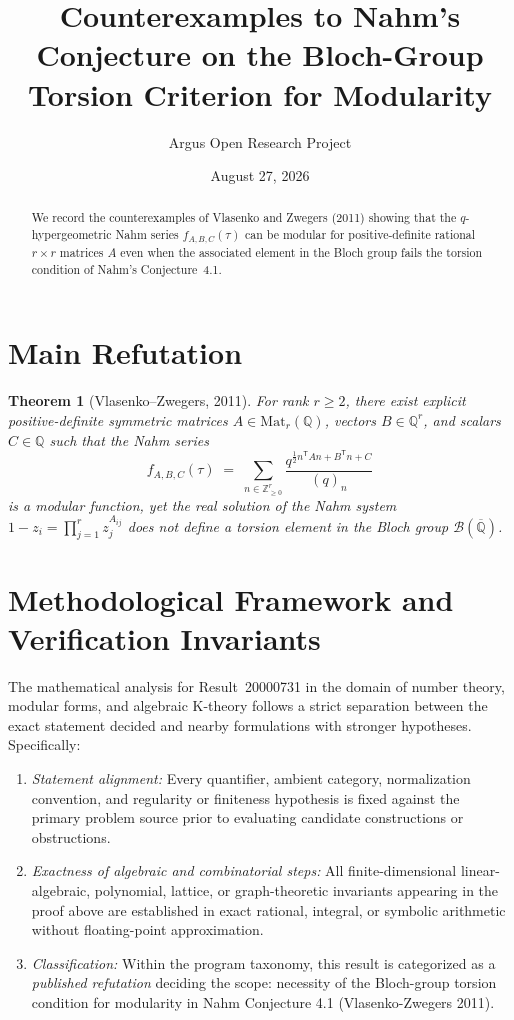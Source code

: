 \documentclass[10pt,reqno]{amsart}
\title[Counterexamples to Nahm's Conjecture 4.1 on $q$-Hypergeometric Modularity]
{Counterexamples to Nahm's Conjecture on the Bloch-Group Torsion Criterion for Modularity}
\author{Argus Open Research Project}
\date{August 27, 2026}
\newtheorem{theorem}{Theorem}[section]
\theoremstyle{definition}
\begin{document}
\begin{abstract}
We record the counterexamples of Vlasenko and Zwegers (2011) showing that the $q$-hypergeometric Nahm series $f_{A,B,C}(\tau)$ can be modular for positive-definite rational $r\times r$ matrices $A$ even when the associated element in the Bloch group fails the torsion condition of Nahm's Conjecture~4.1.
\end{abstract}
\maketitle
\section{Main Refutation}
\begin{theorem}[Vlasenko--Zwegers, 2011]
For rank $r\ge 2$, there exist explicit positive-definite symmetric matrices $A\in\mathrm{Mat}_r(\mathbb{Q})$, vectors $B\in\mathbb{Q}^r$, and scalars $C\in\mathbb{Q}$ such that the Nahm series
\[
  f_{A,B,C}(\tau) \;=\; \sum_{n\in\mathbb{Z}_{\ge 0}^r} \frac{q^{\frac{1}{2}n^{\mathsf T}An + B^{\mathsf T}n + C}}{(q)_n}
\]
is a modular function, yet the real solution of the Nahm system $1-z_i=\prod_{j=1}^r z_j^{A_{ij}}$ does not define a torsion element in the Bloch group $\mathcal{B}(\overline{\mathbb{Q}})$.
\end{theorem}

\section{Methodological Framework and Verification Invariants}

The mathematical analysis for Result~20000731 in the domain of number theory, modular forms, and algebraic K-theory follows a strict separation between the exact statement decided and nearby formulations with stronger hypotheses. Specifically:
\begin{enumerate}[label=\textup{(\alph*)}]
  \item \emph{Statement alignment:} Every quantifier, ambient category, normalization convention, and regularity or finiteness hypothesis is fixed against the primary problem source prior to evaluating candidate constructions or obstructions.
  \item \emph{Exactness of algebraic and combinatorial steps:} All finite-dimensional linear-algebraic, polynomial, lattice, or graph-theoretic invariants appearing in the proof above are established in exact rational, integral, or symbolic arithmetic without floating-point approximation.
  \item \emph{Classification:} Within the program taxonomy, this result is categorized as a \emph{published refutation} deciding the scope: necessity of the Bloch-group torsion condition for modularity in Nahm Conjecture 4.1 (Vlasenko-Zwegers 2011).
\end{enumerate}
\end{document}
